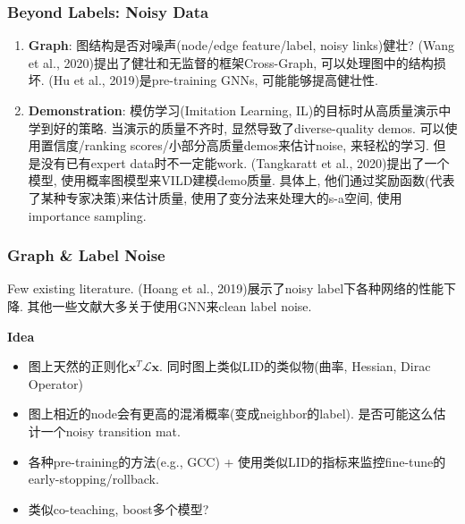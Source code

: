 \documentclass{beamer}
\newcommand{\bt}[1]{\textbf{#1}}
\newcommand{\bs}[1]{\boldsymbol{#1}}
\begin{document}
\begin{frame}
    \frametitle{Beyond Labels: Noisy Data}

    \begin{enumerate}
        \item \bt{Graph}: 图结构是否对噪声(node/edge feature/label, noisy links)健壮? (Wang  et  al., 2020)提出了健壮和无监督的框架Cross-Graph, 可以处理图中的结构损坏. (Hu et al., 2019)是pre-training GNNs, 可能能够提高健壮性.
        \item \bt{Demonstration}: 模仿学习(Imitation Learning, IL)的目标时从高质量演示中学到好的策略. 当演示的质量不齐时, 显然导致了diverse-quality demos. 可以使用置信度/ranking scores/小部分高质量demos来估计noise, 来轻松的学习. 但是没有已有expert data时不一定能work. (Tangkaratt et al., 2020)提出了一个模型, 使用概率图模型来VILD建模demo质量. 具体上, 他们通过奖励函数(代表了某种专家决策)来估计质量, 使用了变分法来处理大的s-a空间, 使用importance sampling.
    \end{enumerate}

\end{frame}

\begin{frame}
    \frametitle{Graph \& Label Noise}

    Few existing literature. (Hoang et al., 2019)展示了noisy label下各种网络的性能下降. 其他一些文献大多关于使用GNN来clean label noise.

    \bt{Idea} 
    \begin{itemize}
        \item 图上天然的正则化$\bs x^T \mathcal L \bs x$. 同时图上类似LID的类似物(曲率, Hessian, Dirac Operator)
        \item 图上相近的node会有更高的混淆概率(变成neighbor的label). 是否可能这么估计一个noisy transition mat.
        \item 各种pre-training的方法(e.g., GCC) + 使用类似LID的指标来监控fine-tune的early-stopping/rollback.
        \item 类似co-teaching, boost多个模型?
    \end{itemize}

\end{frame}
\end{document}
